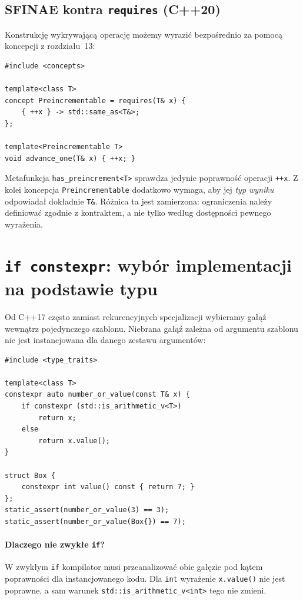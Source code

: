 \subsection{SFINAE kontra \texttt{requires} (C++20)}

Konstrukcję wykrywającą operację możemy wyrazić bezpośrednio za pomocą
koncepcji z rozdziału~13:

\begin{lstlisting}
#include <concepts>

template<class T>
concept Preincrementable = requires(T& x) {
    { ++x } -> std::same_as<T&>;
};

template<Preincrementable T>
void advance_one(T& x) { ++x; }
\end{lstlisting}

Metafunkcja \texttt{has\_preincrement<T>} sprawdza jedynie poprawność
operacji \texttt{++x}. Z kolei koncepcja \texttt{Preincrementable}
dodatkowo wymaga, aby jej \emph{typ wyniku} odpowiadał dokładnie \texttt{T\&}.
Różnica ta jest zamierzona: ograniczenia należy definiować zgodnie z
kontraktem, a nie tylko według dostępności pewnego wyrażenia.

\section{\texttt{if constexpr}: wybór implementacji na podstawie typu}
\label{sec:cpp9-ifconstexpr}

Od C++17 często zamiast rekurencyjnych specjalizacji wybieramy gałąź
wewnątrz pojedynczego szablonu. Niebrana gałąź zależna od argumentu
szablonu nie jest instancjowana dla danego zestawu argumentów:

\begin{lstlisting}
#include <type_traits>

template<class T>
constexpr auto number_or_value(const T& x) {
    if constexpr (std::is_arithmetic_v<T>)
        return x;
    else
        return x.value();
}

struct Box {
    constexpr int value() const { return 7; }
};
static_assert(number_or_value(3) == 3);
static_assert(number_or_value(Box{}) == 7);
\end{lstlisting}

\paragraph{Dlaczego nie zwykłe \texttt{if}?}
W zwykłym \texttt{if} kompilator musi przeanalizować obie gałęzie
pod kątem poprawności dla instancjowanego kodu. Dla \texttt{int}
wyrażenie \texttt{x.value()} nie jest poprawne, a sam warunek
\texttt{std::is\_arithmetic\_v<int>} tego nie zmieni.

